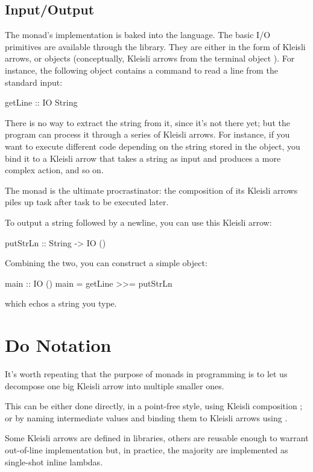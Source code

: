 \documentclass[DaoFP]{subfiles}
\begin{document}
\subsection{Input/Output}

The  monad's implementation is baked into the language. The basic I/O primitives are available through the library. They are either in the form of Kleisli arrows, or  objects (conceptually, Kleisli arrows from the terminal object \hask{()}). For instance, the following object contains a command to read a line from the standard input:
\begin{haskell}
getLine :: IO String
\end{haskell}
There is no way to extract the string from it, since it's not there yet; but the program can process it through a series of Kleisli arrows. For instance, if you want to execute different code depending on the string stored in the  object, you bind it to a Kleisli arrow that takes a string as input and produces a more complex  action, and so on. 

The  monad is the ultimate procrastinator: the composition of its Kleisli arrows piles up task after task to be executed later.

To output a string followed by a newline, you can use this Kleisli arrow:
\begin{haskell}
putStrLn :: String -> IO ()
\end{haskell}
Combining the two, you can construct a simple  object:
\begin{haskell}
main :: IO ()
main = getLine >>= putStrLn
\end{haskell}
which echos a string you type.

\section{Do Notation}

It's worth repeating that the purpose of monads in programming is to let us decompose one big Kleisli arrow into multiple smaller ones. 

This can be either done directly, in a point-free style, using Kleisli composition \hask{<=<}; or by naming intermediate values and binding them to Kleisli arrows using \hask{>>=}. 

Some Kleisli arrows are defined in libraries, others are reusable enough to warrant out-of-line implementation but, in practice, the majority are implemented as single-shot inline lambdas.
\end{document}
